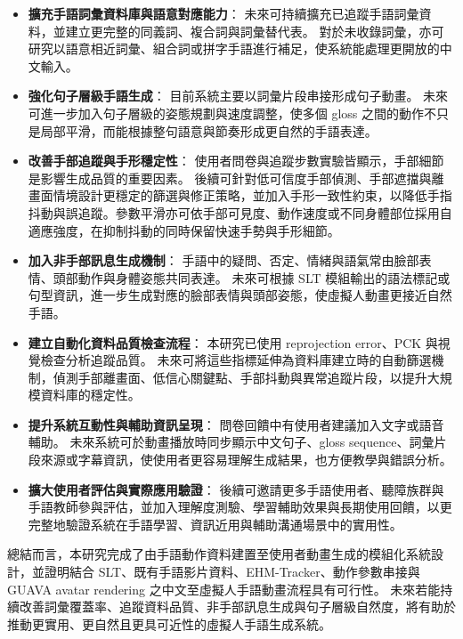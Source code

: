 \documentclass[class=NCU_thesis, crop=false]{standalone}
\begin{document}
\begin{itemize}
    \item \textbf{擴充手語詞彙資料庫與語意對應能力}：
    未來可持續擴充已追蹤手語詞彙資料，並建立更完整的同義詞、複合詞與詞彙替代表。
    對於未收錄詞彙，亦可研究以語意相近詞彙、組合詞或拼字手語進行補足，使系統能處理更開放的中文輸入。

    \item \textbf{強化句子層級手語生成}：
    目前系統主要以詞彙片段串接形成句子動畫。
    未來可進一步加入句子層級的姿態規劃與速度調整，使多個 gloss 之間的動作不只是局部平滑，而能根據整句語意與節奏形成更自然的手語表達。

    \item \textbf{改善手部追蹤與手形穩定性}：
    使用者問卷與追蹤步數實驗皆顯示，手部細節是影響生成品質的重要因素。
    後續可針對低可信度手部偵測、手部遮擋與離畫面情境設計更穩定的篩選與修正策略，並加入手形一致性約束，以降低手指抖動與誤追蹤。參數平滑亦可依手部可見度、動作速度或不同身體部位採用自適應強度，在抑制抖動的同時保留快速手勢與手形細節。

    \item \textbf{加入非手部訊息生成機制}：
    手語中的疑問、否定、情緒與語氣常由臉部表情、頭部動作與身體姿態共同表達。
    未來可根據 SLT 模組輸出的語法標記或句型資訊，進一步生成對應的臉部表情與頭部姿態，使虛擬人動畫更接近自然手語。

    \item \textbf{建立自動化資料品質檢查流程}：
    本研究已使用 reprojection error、PCK 與視覺檢查分析追蹤品質。
    未來可將這些指標延伸為資料庫建立時的自動篩選機制，偵測手部離畫面、低信心關鍵點、手部抖動與異常追蹤片段，以提升大規模資料庫的穩定性。

    \item \textbf{提升系統互動性與輔助資訊呈現}：
    問卷回饋中有使用者建議加入文字或語音輔助。
    未來系統可於動畫播放時同步顯示中文句子、gloss sequence、詞彙片段來源或字幕資訊，使使用者更容易理解生成結果，也方便教學與錯誤分析。

    \item \textbf{擴大使用者評估與實際應用驗證}：
    後續可邀請更多手語使用者、聽障族群與手語教師參與評估，並加入理解度測驗、學習輔助效果與長期使用回饋，以更完整地驗證系統在手語學習、資訊近用與輔助溝通場景中的實用性。
\end{itemize}

總結而言，本研究完成了由手語動作資料建置至使用者動畫生成的模組化系統設計，並證明結合 SLT、既有手語影片資料、EHM-Tracker、動作參數串接與 GUAVA avatar rendering 之中文至虛擬人手語動畫流程具有可行性。
未來若能持續改善詞彙覆蓋率、追蹤資料品質、非手部訊息生成與句子層級自然度，將有助於推動更實用、更自然且更具可近性的虛擬人手語生成系統。
\end{document}
